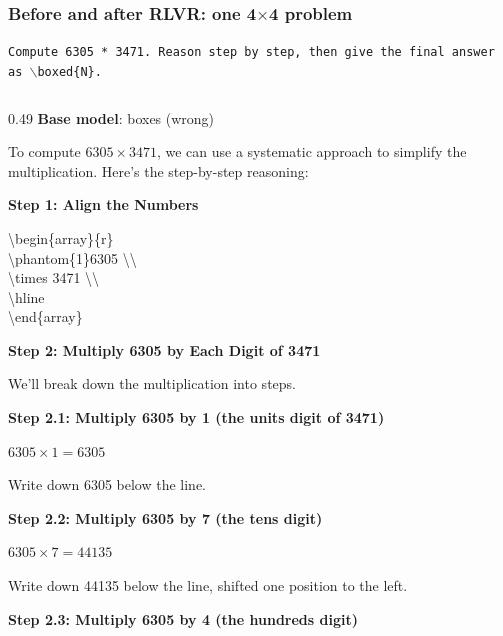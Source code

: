 \begin{frame}
    \frametitle{Before and after RLVR: one 4$\times$4 problem}
    \providecommand{\nl}{\textcolor{gray}{$\hookleftarrow$}\allowbreak\ }
    \centering
    {\scriptsize \texttt{Compute 6305 * 3471. Reason step by step, then give the final answer as $\backslash$boxed\{N\}.}}

    \begin{columns}[T]
    \begin{column}{0.49\linewidth}
    \centering \footnotesize \textbf{Base model}: boxes  (wrong)
    \begin{block}{}
    \raggedright \tiny \setlength{\parskip}{0pt}\setlength{\abovedisplayskip}{1pt}\setlength{\belowdisplayskip}{1pt}\setlength{\abovedisplayshortskip}{0pt}\setlength{\belowdisplayshortskip}{1pt}
    To compute $6305 \times 3471$, we can use a systematic approach to simplify the multiplication. Here's the step-by-step reasoning:\par
    \par
    \textbf{Step 1: Align the Numbers}\par
    {\ttfamily \textbackslash{}begin\{array\}\{r\}\\ \textbackslash{}phantom\{1\}6305 \textbackslash{}\textbackslash{}\\ \textbackslash{}times 3471 \textbackslash{}\textbackslash{}\\ \textbackslash{}hline\\ \textbackslash{}end\{array\}\par}
    \par
    \textbf{Step 2: Multiply 6305 by Each Digit of 3471}\par
    We'll break down the multiplication into steps.\par
    \par
    \textbf{Step 2.1: Multiply 6305 by 1 (the units digit of 3471)}\par
    {\centering $6305 \times 1 = 6305$\par}
    Write down 6305 below the line.\par
    \par
    \textbf{Step 2.2: Multiply 6305 by 7 (the tens digit)}\par
    {\centering $6305 \times 7 = 44135$\par}
    Write down 44135 below the line, shifted one position to the left.\par
    \par
    \textbf{Step 2.3: Multiply 6305 by 4 (the hundreds digit)}\par

\end{block}
\end{column}
\end{columns}
\end{frame}

